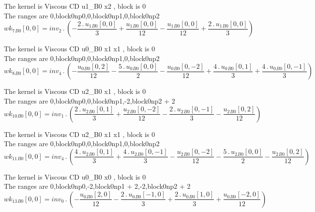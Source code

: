 \documentclass{article}
\begin{document}
\noindent The kernel is Viscous CD u1_B0 x2 , block is 0\\\noindent The ranges are 0,block0np0,0,block0np1,0,block0np2\\\begin{dmath}{wk_{7}{_{B0}}}[{0,0}] = inv_2 \,.\, \left(- \frac{2 \,.\, {u_{1}{_{B0}}}[{0,0}]}{3} + \frac{{u_{1}{_{B0}}}[{0,0}]}{12} - \frac{{u_{1}{_{B0}}}[{0,0}]}{12} + \frac{2 \,.\, {u_{1}{_{B0}}}[{0,0}]}{3}\right)\end{dmath}

\noindent The kernel is Viscous CD u0_B0 x1 x1 , block is 0\\\noindent The ranges are 0,block0np0,0,block0np1,0,block0np2\\\begin{dmath}{wk_{8}{_{B0}}}[{0,0}] = inv_4 \,.\, \left(- \frac{{u_{0}{_{B0}}}[{0,2}]}{12} - \frac{5 \,.\, {u_{0}{_{B0}}}[{0,0}]}{2} - \frac{{u_{0}{_{B0}}}[{0,-2}]}{12} + \frac{4 \,.\, {u_{0}{_{B0}}}[{0,1}]}{3} + \frac{4 \,.\, 
{u_{0}{_{B0}}}[{0,-1}]}{3}\right)\end{dmath}

\noindent The kernel is Viscous CD u2_B0 x1 , block is 0\\\noindent The ranges are 0,block0np0,0,block0np1,-2,block0np2 + 2\\\begin{dmath}{wk_{10}{_{B0}}}[{0,0}] = inv_1 \,.\, \left(\frac{2 \,.\, {u_{2}{_{B0}}}[{0,1}]}{3} + \frac{{u_{2}{_{B0}}}[{0,-2}]}{12} - \frac{2 \,.\, {u_{2}{_{B0}}}[{0,-1}]}{3} - \frac{{u_{2}{_{B0}}}[{0,2}]}{12}\right)\end{dmath}

\noindent The kernel is Viscous CD u2_B0 x1 x1 , block is 0\\\noindent The ranges are 0,block0np0,0,block0np1,0,block0np2\\\begin{dmath}{wk_{11}{_{B0}}}[{0,0}] = inv_4 \,.\, \left(\frac{4 \,.\, {u_{2}{_{B0}}}[{0,1}]}{3} + \frac{4 \,.\, {u_{2}{_{B0}}}[{0,-1}]}{3} - \frac{{u_{2}{_{B0}}}[{0,-2}]}{12} - \frac{5 \,.\, {u_{2}{_{B0}}}[{0,0}]}{2} - 
\frac{{u_{2}{_{B0}}}[{0,2}]}{12}\right)\end{dmath}

\noindent The kernel is Viscous CD u0_B0 x0 , block is 0\\\noindent The ranges are 0,block0np0,-2,block0np1 + 2,-2,block0np2 + 2\\\begin{dmath}{wk_{13}{_{B0}}}[{0,0}] = inv_0 \,.\, \left(- \frac{{u_{0}{_{B0}}}[{2,0}]}{12} - \frac{2 \,.\, {u_{0}{_{B0}}}[{-1,0}]}{3} + \frac{2 \,.\, {u_{0}{_{B0}}}[{1,0}]}{3} + \frac{{u_{0}{_{B0}}}[{-2,0}]}{12}\right)\end{dmath}
\end{document}
